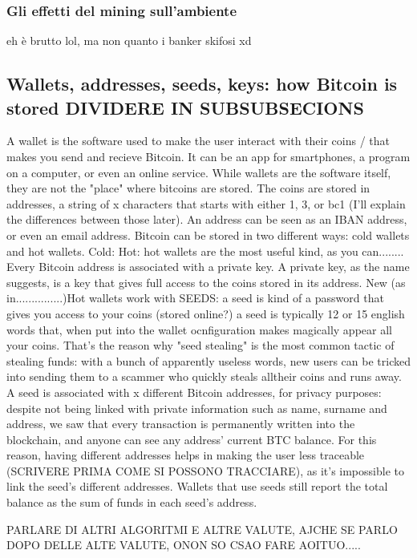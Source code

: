 \documentclass {article}
\begin{document}
\subsubsection {Gli effetti del mining sull'ambiente}

eh è brutto lol, ma non quanto i banker skifosi xd

\subsection {Wallets, addresses, seeds, keys: how Bitcoin is stored DIVIDERE IN SUBSUBSECIONS}

A wallet is the software used to make the user interact with their coins / that makes you send and recieve Bitcoin. It can be an app for smartphones, a program on a computer, or even an online service.
While wallets are the software itself, they are not the "place" where bitcoins are stored. The coins are stored in addresses, a string of x characters that starts with either 1, 3, or bc1 (I'll explain the differences between those later). An address can be seen as an IBAN address, or even an email address.
Bitcoin can be stored in two different ways: cold wallets and hot wallets.
Cold:
Hot: hot wallets are the most useful kind, as you can........
Every Bitcoin address is associated with a private key.
A private key, as the name suggests, is a key that gives full access to the coins stored in its address.
New (as in...............)Hot wallets work with SEEDS: a seed is kind of a password that gives you access to your coins (stored online?) a seed is typically 12 or 15 english words that, when put into the wallet ocnfiguration makes magically appear all your coins. That's the reason why "seed stealing" is the most common tactic of stealing funds: with a bunch of apparently useless words, new users can be tricked into sending them to a scammer who quickly steals alltheir coins and runs away.
A seed is associated with x different Bitcoin addresses, for privacy purposes: despite not being linked with private information such as name, surname and address, we saw that every transaction is permanently written into the blockchain, and anyone can see any address' current BTC balance. For this reason, having different addresses helps in making the user less traceable (SCRIVERE PRIMA COME SI POSSONO TRACCIARE), as it's impossible to link the seed's different addresses. Wallets that use seeds still report the total balance as the sum of funds in each seed's address.

PARLARE DI ALTRI ALGORITMI E ALTRE VALUTE, AJCHE SE PARLO DOPO DELLE ALTE VALUTE, ONON SO CSAO FARE AOITUO.....
\end{document}
